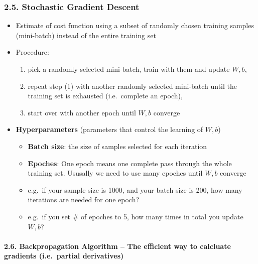 \documentclass[11pt]{article}
\providecommand{\tightlist}{%
      \setlength{\itemsep}{0pt}\setlength{\parskip}{0pt}}
\begin{document}
    \hypertarget{stochastic-gradient-descent}{%
\subsubsection{2.5. Stochastic Gradient
Descent}\label{stochastic-gradient-descent}}

\begin{itemize}
\tightlist
\item
  Estimate of cost function using a subset of randomly chosen training
  samples (mini-batch) instead of the entire training set
\item
  Procedure:

  \begin{enumerate}
  \def\labelenumi{\arabic{enumi}.}
  \tightlist
  \item
    pick a randomly selected mini-batch, train with them and update
    \(W, b\),
  \item
    repeat step (1) with another randomly selected mini-batch until the
    training set is exhausted (i.e.~complete an epoch),
  \item
    start over with another epoch until \(W, b\) converge
  \end{enumerate}
\item
  \textbf{Hyperparameters} (parameters that control the learning of
  \(W, b\))

  \begin{itemize}
  \tightlist
  \item
    \textbf{Batch size}: the size of samples selected for each iteration
  \item
    \textbf{Epoches}: One epoch means one complete pass through the
    whole training set. Ususally we need to use many epoches until
    \(W, b\) converge
  \item
    e.g.~if your sample size is 1000, and your batch size is 200, how
    many iterations are needed for one epoch?
  \item
    e.g.~if you set \# of epoches to 5, how many times in total you
    update \(W, b\)?
  \end{itemize}
\end{itemize}

    \hypertarget{backpropagation-algorithm-the-efficient-way-to-calcluate-gradients-i.e.partial-derivatives}{%
\paragraph{2.6. Backpropagation Algorithm -- The efficient way to
calcluate gradients (i.e.~partial
derivatives)}\label{backpropagation-algorithm-the-efficient-way-to-calcluate-gradients-i.e.partial-derivatives}}
\end{document}
